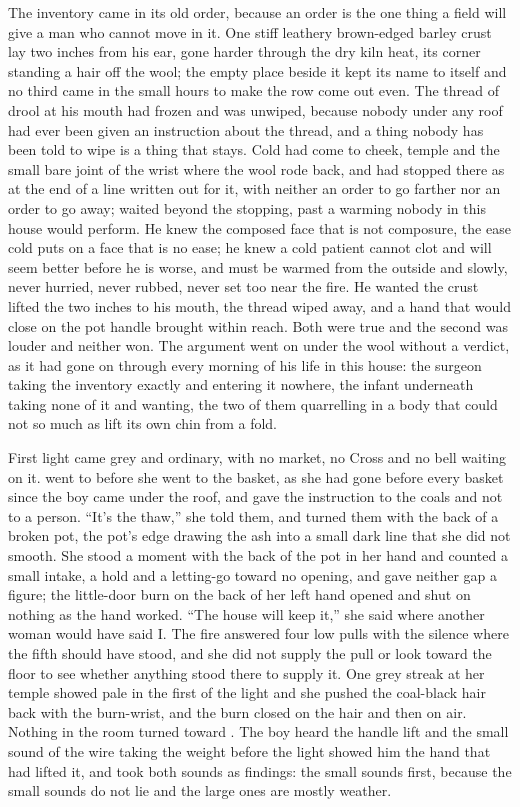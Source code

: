 The inventory came in its old order, because an order is the one thing a field will give a man who cannot move in it. One stiff leathery brown-edged barley crust lay two inches from his ear, gone harder through the dry kiln heat, its corner standing a hair off the wool; the empty place beside it kept its name to itself and no third came in the small hours to make the row come out even. The thread of drool at his mouth had frozen and was unwiped, because nobody under any roof had ever been given an instruction about the thread, and a thing nobody has been told to wipe is a thing that stays. Cold had come to cheek, temple and the small bare joint of the wrist where the wool rode back, and had stopped there as at the end of a line written out for it, with neither an order to go farther nor an order to go away;  waited beyond the stopping, past a warming nobody in this house would perform. He knew the composed face that is not composure, the ease cold puts on a face that is no ease; he knew a cold patient cannot clot and will seem better before he is worse, and must be warmed from the outside and slowly, never hurried, never rubbed, never set too near the fire. He wanted the crust lifted the two inches to his mouth, the thread wiped away, and a hand that would close on the pot handle brought within reach. Both were true and the second was louder and neither won. The argument went on under the wool without a verdict, as it had gone on through every morning of his life in this house: the surgeon taking the inventory exactly and entering it nowhere, the infant underneath taking none of it and wanting, the two of them quarrelling in a body that could not so much as lift its own chin from a fold.

First light came grey and ordinary, with no market, no Cross and no bell waiting on it.  went to  before she went to the basket, as she had gone before every basket since the boy came under the roof, and gave the instruction to the coals and not to a person. “It's the thaw,” she told them, and turned them with the back of a broken pot, the pot's edge drawing the ash into a small dark line that she did not smooth. She stood a moment with the back of the pot in her hand and counted a small intake, a hold and a letting-go toward no opening, and gave neither gap a figure; the little-door burn on the back of her left hand opened and shut on nothing as the hand worked. “The house will keep it,” she said where another woman would have said I. The fire answered four low pulls with the silence where the fifth should have stood, and she did not supply the pull or look toward the floor to see whether anything stood there to supply it. One grey streak at her temple showed pale in the first of the light and she pushed the coal-black hair back with the burn-wrist, and the burn closed on the hair and then on air. Nothing in the room turned toward . The boy heard the handle lift and the small sound of the wire taking the weight before the light showed him the hand that had lifted it, and took both sounds as findings: the small sounds first, because the small sounds do not lie and the large ones are mostly weather.

